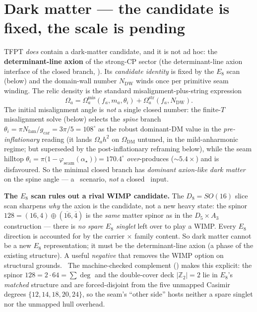 \documentclass[11pt,a4paper]{article}
\newcommand{\Nfam}{N_{\mathrm{fam}}}
\newcommand{\Z}{\mathbb{Z}}
\begin{document}
\section{Dark matter --- the candidate is fixed, the scale is pending}
TFPT \emph{does} contain a dark-matter candidate, and it is not ad hoc: the \textbf{determinant-line
axion} of the strong-CP sector (the determinant-line axion interface of the closed branch, \mE). Its
\emph{candidate identity} is fixed by the $E_8$ scan (below) and the domain-wall number $N_{\mathrm{DW}}$
winds once per primitive seam winding. The relic density is the standard misalignment-plus-string
expression
\[
  \Omega_a=\Omega_a^{\mathrm{mis}}(f_a,m_a,\theta_i)+\Omega_a^{\mathrm{str}}(f_a,N_{\mathrm{DW}}).
\]
The initial misalignment angle is \emph{not} a single closed number: the finite-$T$ misalignment solve
(below) selects the \emph{spine} branch $\theta_i=\pi\Nfam/g_{\mathrm{car}}=3\pi/5=108^\circ$ as the
robust dominant-DM value in the \emph{pre-inflationary} reading (it lands $\Omega_a h^2$ on $\Omega_{\mathrm{DM}}$ untuned, in the mild-anharmonic
regime; but superseded by the post-inflationary reframing below), while the seam hilltop $\theta_i=\pi\bigl(1-\varphi_{\mathrm{seam}}(\alpha_\star)\bigr)=170.4^\circ$
\emph{over}-produces (${\sim}5.4\times$) and is disfavoured. So the minimal closed branch has
\emph{dominant axion-like dark matter} on the spine angle --- a \mC\ scenario, \emph{not} a closed \mE\ input.

\par\smallskip\noindent\textbf{The $E_8$ scan rules out a rival WIMP candidate.}
The $D_8=SO(16)$ slice scan sharpens \emph{why} the axion is the candidate, not a new heavy state: the
spinor $128=(16,4)\oplus(\overline{16},\overline4)$ is the \emph{same} matter spinor as in the
$D_5\times A_3$ construction --- there is \emph{no spare $E_8$ singlet} left over to play a WIMP. Every
$E_8$ direction is accounted for by the carrier $\times$ family content. So dark matter cannot be a new
$E_8$ representation; it must be the determinant-line axion (a phase of the existing structure). A useful
\emph{negative} that removes the WIMP option on structural grounds. \mE\ The machine-checked complement
() makes this explicit: the spinor $128=2\cdot64=\sum\deg$ and the
double-cover deck $|\Z_2|=2$ lie in $E_8$'s \emph{matched} structure and are forced-disjoint from the five
unmapped Casimir degrees $\{12,14,18,20,24\}$, so the seam's ``other side'' hosts neither a spare singlet nor
the unmapped hull overhead.
\end{document}
